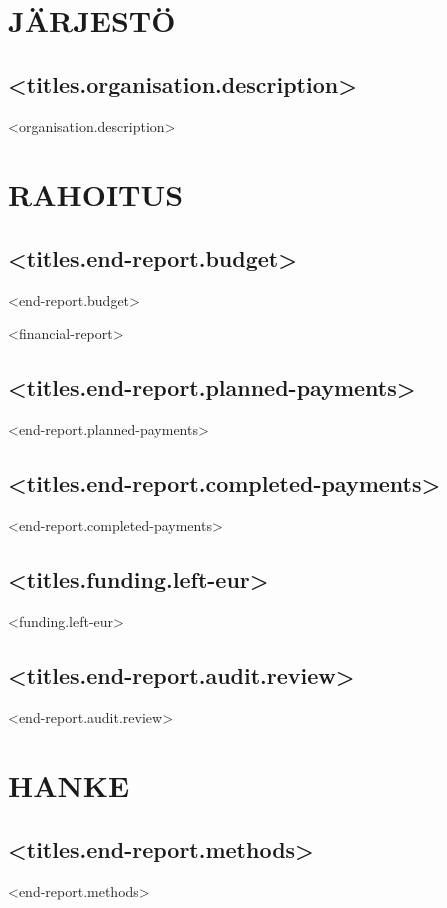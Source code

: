 \documentclass[twoside,a4paper]{article}
\begin{document}
	\section{JÄRJESTÖ}
		
		\subsection*{<titles.organisation.description>}
		    <organisation.description>
		
	\newpage		
	\section{RAHOITUS}
		\subsection*{<titles.end-report.budget>}
		    <end-report.budget>
		    
		<financial-report>

		\subsection*{<titles.end-report.planned-payments>}
		    <end-report.planned-payments>
		
		\subsection*{<titles.end-report.completed-payments>}
		    <end-report.completed-payments>
		
		\subsection*{<titles.funding.left-eur>}
		    <funding.left-eur>
		    
		\subsection*{<titles.end-report.audit.review>}
		    <end-report.audit.review>

	\newpage		
	\section{HANKE}
		\subsection*{<titles.end-report.methods>}
		    <end-report.methods>
		
\end{document}
